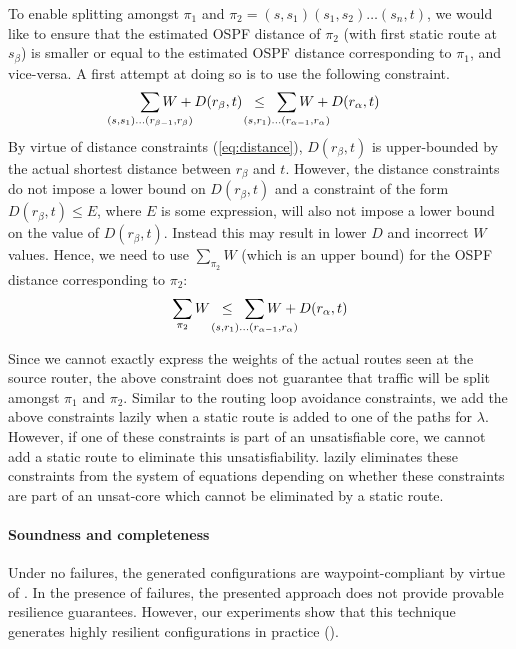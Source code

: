 To enable splitting amongst
$\pi_1$ and $\pi_2 = (s, s_1)(s_1, s_2)\ldots(s_n, t)$, we 
would like to ensure that 
the estimated OSPF distance of $\pi_2$ (with first static route at $s_\beta$)
is smaller or equal to 
the estimated OSPF distance corresponding to $\pi_1$, and vice-versa.
A first attempt at doing so is to use the following constraint.
\begin{equation}
	\sum_{\mathclap{\substack{(s, s_1)\ldots(r_{\beta-1}, r_\beta)}}} W + D(r_\beta, t) 
	 \hspace{0.2cm} \leq \hspace{0.2cm} \sum_{\mathclap{\substack{(s, r_1)\ldots(r_{\alpha-1}, r_\alpha)}}} W + D(r_\alpha, t)
\end{equation}
By virtue of distance constraints (\ref{eq:distance}), 
$D(r_\beta,t)$ is upper-bounded by the actual shortest
distance between $r_\beta$ and $t$.  However, the distance
constraints do not impose a lower bound on $D(r_\beta,t)$
and
 a constraint of the form $D(r_\beta,t) \leq E$, where 
$E$ is some expression, will also not impose a lower bound
on the value of $D(r_\beta,t)$.
Instead this may result in lower $D$ and incorrect 
$W$ values.
Hence,  we need to use $\sum_{\pi_2}W$ (which is an upper bound)
for the OSPF distance corresponding to 
$\pi_2$:
\begin{equation}
\sum_{\mathclap{\substack{\pi_2}}} W 
\hspace{0.2cm} \leq \hspace{0.2cm} \sum_{\mathclap{\substack{(s, r_1)\ldots(r_{\alpha-1}, r_\alpha)}}} W + D(r_\alpha, t)
\end{equation}

Since we cannot exactly express the weights of the actual routes seen 
at the source router, the above constraint does not  guarantee 
that traffic will be split amongst
$\pi_1$ and $\pi_2$. 
Similar to the routing loop avoidance constraints, we add the
above constraints lazily when a static route is added to one of the
paths for $\lambda$. However, if one of these constraints is part of 
an unsatisfiable core, we cannot add a static route to eliminate 
this unsatisfiability. \name lazily eliminates these constraints from the
system of equations depending on whether these constraints are part of 
an unsat-core which cannot be eliminated by a static route. 

\paragraph{Soundness and completeness}
Under no failures, the generated configurations are
waypoint-compliant by virtue of .
In the presence of failures, the presented approach does not provide provable resilience guarantees.
However,  our experiments show that
this technique generates highly resilient configurations 
in practice (). 

